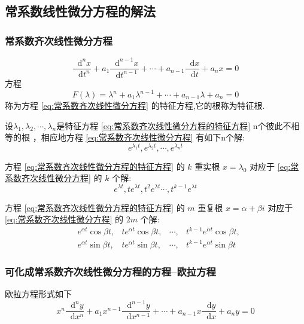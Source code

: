 \documentclass{ctexart}
\newcommand*{\dif}{\mathop{}\!\mathrm{d}}
\numberwithin{equation}{subsection}
\begin{document}
\subsection{常系数线性微分方程的解法}
\subsubsection{常系数齐次线性微分方程}
\label{section:常系数齐次线性微分方程}
\begin{equation}
        \label{eq:常系数齐次线性微分方程}
        \frac{\dif^nx}{\dif t^n}+a_1\frac{\dif^{n-1}x}{\dif t^{n-1}}+\cdots+a_{n-1}\frac{\dif x}{\dif t}+a_nx=0
\end{equation}
方程 
\begin{equation}
        \label{eq:常系数齐次线性微分方程的特征方程}
        F(\lambda)=\lambda^n+a_1\lambda^{n-1}+\cdots+a_{n-1}\lambda+a_n=0
\end{equation}
称为方程 \eqref{eq:常系数齐次线性微分方程} 的特征方程,它的根称为特征根.

设$\lambda_1,\lambda_2,\cdots,\lambda_n$是特征方程 \eqref{eq:常系数齐次线性微分方程的特征方程} n个彼此不相等的根 ，相应地方程 \eqref{eq:常系数齐次线性微分方程} 有如下n个解:
\[e^{\lambda_1 t},e^{\lambda_2 t},\cdots,e^{\lambda_n t}\]

方程 \eqref{eq:常系数齐次线性微分方程的特征方程} 的 $k$ 重实根 $x=\lambda_0$ 对应于 \eqref{eq:常系数齐次线性微分方程} 的 $k$ 个解:
\[e^{\lambda t},te^{\lambda t},t^2e^{\lambda t}\cdots,t^{k-1}e^{\lambda t}\]

方程 \eqref{eq:常系数齐次线性微分方程的特征方程} 的 $m$ 重复根 $x=\alpha+\beta i$ 对应于 \eqref{eq:常系数齐次线性微分方程} 的 $2m$ 个解:
\[\begin{aligned}
        &e^{\alpha t}\cos\beta t,&te^{\alpha t}\cos\beta t,&\cdots,&t^{k-1}e^{\alpha t}\cos \beta t,\\
        &e^{\alpha t}\sin\beta t,&te^{\alpha t}\sin\beta t,&\cdots,&t^{k-1}e^{\alpha t}\sin\beta t
\end{aligned}\]



\subsubsection{可化成常系数齐次线性微分方程的方程--欧拉方程}
欧拉方程形式如下
\begin{equation}
        \label{eq:欧拉方程}
        x^n\frac{\dif^n y}{\dif x^n}+a_1x^{n-1}\frac{\dif ^{n-1}y}{\dif x^{n-1}}+\cdots+a_{n-1}x\frac{\dif y}{\dif x}+a_ny=0
\end{equation}
\end{document}

